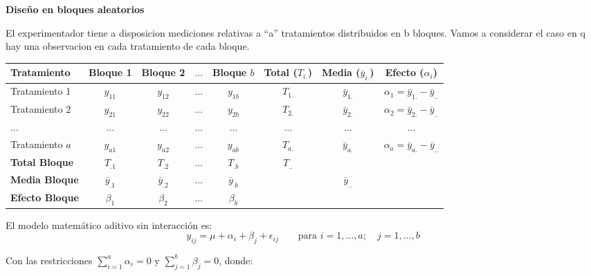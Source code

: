 \documentclass[12pt,a4paper]{article}
\begin{document}
{\fontsize{17}{21}\selectfont\bfseries Diseño en bloques aleatorios\par}

\hspace{14pt}\begin{minipage}{0.95\linewidth}
El experimentador tiene a disposicion mediciones relativas a ``a'' tratamientos distribuidos en b bloques. Vamos a considerar el caso en q hay una observacion en cada tratamiento de cada bloque.
\end{minipage}

\begin{center}
{\fontsize{11.5}{14}\selectfont
\setlength{\tabcolsep}{5pt}
\begin{tabular}{l | c c c c | c | c | c}
\toprule
\textbf{Tratamiento} & \textbf{Bloque 1} & \textbf{Bloque 2} & $\ldots$ & \textbf{Bloque $b$} & \textbf{Total ($T_{i.}$)} & \textbf{Media ($\bar{y}_{i.}$)} & \textbf{Efecto ($\alpha_i$)} \\
\midrule
Tratamiento 1 & $y_{11}$ & $y_{12}$ & $\ldots$ & $y_{1b}$ & $T_{1.}$ & $\bar{y}_{1.}$ & $\alpha_1=\bar{y}_{1.}-\bar{y}_{..}$ \\
Tratamiento 2 & $y_{21}$ & $y_{22}$ & $\ldots$ & $y_{2b}$ & $T_{2.}$ & $\bar{y}_{2.}$ & $\alpha_2=\bar{y}_{2.}-\bar{y}_{..}$ \\
$\ldots$ & $\ldots$ & $\ldots$ & $\ldots$ & $\ldots$ & $\ldots$ & $\ldots$ & $\ldots$ \\
Tratamiento $a$ & $y_{a1}$ & $y_{a2}$ & $\ldots$ & $y_{ab}$ & $T_{a.}$ & $\bar{y}_{a.}$ & $\alpha_a=\bar{y}_{a.}-\bar{y}_{..}$ \\
\midrule
\textbf{Total Bloque} & $T_{.1}$ & $T_{.2}$ & $\ldots$ & $T_{.b}$ & $T_{..}$ & & \\
\textbf{Media Bloque} & $\bar{y}_{.1}$ & $\bar{y}_{.2}$ & $\ldots$ & $\bar{y}_{.b}$ & & $\bar{y}_{..}$ & \\
\textbf{Efecto Bloque} & $\beta_1$ & $\beta_2$ & $\ldots$ & $\beta_b$ & & & \\
\bottomrule
\end{tabular}
}
\end{center}

\hspace{14pt}El modelo matemático aditivo sin interacción es:
\[
y_{ij} = \mu + \alpha_i + \beta_j + \epsilon_{ij} \qquad \text{para } i=1,\ldots,a; \quad j=1,\ldots,b
\]

\hspace{14pt}Con las restricciones $\sum_{i=1}^{a}\alpha_i=0$ y $\sum_{j=1}^{b}\beta_j=0$, donde:
\end{document}

